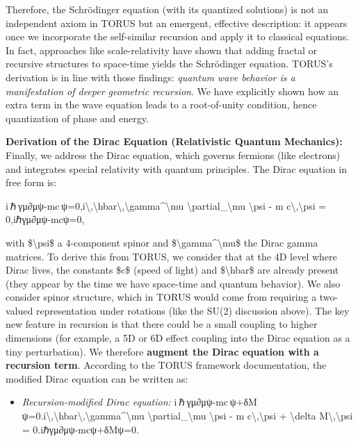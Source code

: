 \documentclass[
]{article}
\begin{document}
{Therefore, the Schrödinger equation (with its quantized solutions) is
not an independent axiom in TORUS but an emergent, effective
description: it appears once we incorporate the self-similar recursion
and apply it to classical equations\hspace{0pt}. In fact, approaches
like scale-relativity have shown that adding fractal or recursive
structures to space-time yields the Schrödinger equation\hspace{0pt}.
TORUS's derivation is in line with those findings: \emph{quantum wave
behavior is a manifestation of deeper geometric recursion}. We have
explicitly shown how an extra term in the wave equation leads to a
root-of-unity condition, hence quantization of phase and energy.

\textbf{Derivation of the Dirac Equation (Relativistic Quantum
Mechanics):} Finally, we address the Dirac equation, which governs
fermions (like electrons) and integrates special relativity with quantum
principles. The Dirac equation in free form is:

i ℏ γμ∂μψ-mc ψ=0,i\textbackslash,\textbackslash hbar\textbackslash,\textbackslash gamma\^{}\textbackslash mu
\textbackslash partial\_\textbackslash mu \textbackslash psi - m
c\textbackslash,\textbackslash psi = 0,iℏγμ∂μ\hspace{0pt}ψ-mcψ=0,

with \$\textbackslash psi\$ a 4-component spinor and
\$\textbackslash gamma\^{}\textbackslash mu\$ the Dirac gamma matrices.
To derive this from TORUS, we consider that at the 4D level where Dirac
lives, the constants \$c\$ (speed of light) and \$\textbackslash hbar\$
are already present (they appear by the time we have space-time and
quantum behavior). We also consider spinor structure, which in TORUS
would come from requiring a two-valued representation under rotations
(like the SU(2) discussion above). The key new feature in recursion is
that there could be a small coupling to higher dimensions (for example,
a 5D or 6D effect coupling into the Dirac equation as a tiny
perturbation). We therefore \textbf{augment the Dirac equation with a
recursion term}. According to the TORUS framework documentation, the
modified Dirac equation can be written as\hspace{0pt}:

\begin{itemize}
\item
  \emph{Recursion-modified Dirac equation:}
  i ℏ γμ∂μψ-mc ψ+δM ψ=0.i\textbackslash,\textbackslash hbar\textbackslash,\textbackslash gamma\^{}\textbackslash mu
  \textbackslash partial\_\textbackslash mu \textbackslash psi - m
  c\textbackslash,\textbackslash psi + \textbackslash delta
  M\textbackslash,\textbackslash psi = 0.iℏγμ∂μ\hspace{0pt}ψ-mcψ+δMψ=0.
\end{itemize}

}
\end{document}
